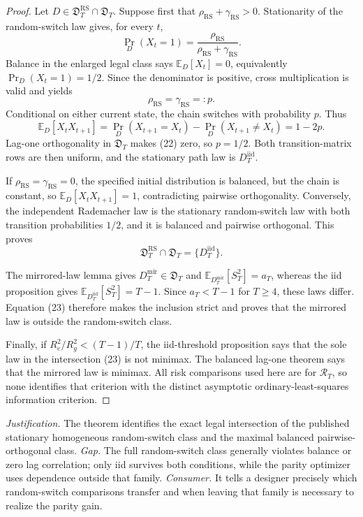 \documentclass{article}
\begin{document}
\begin{proof}
Let \(D\in\mathfrak D_T^{\mathrm{RS}}\cap\mathfrak D_T\).  Suppose first that \(\rho_{\mathrm{RS}}+\gamma_{\mathrm{RS}}>0\).  Stationarity of the random-switch law gives, for every \(t\),
\[
\Pr_D(X_t=1)=\frac{\rho_{\mathrm{RS}}}{\rho_{\mathrm{RS}}+\gamma_{\mathrm{RS}}}.
\]
Balance in the enlarged legal class says \(\mathbb E_D[X_t]=0\), equivalently \(\Pr_D(X_t=1)=1/2\).  Since the denominator is positive, cross multiplication is valid and yields
\[
\rho_{\mathrm{RS}}=\gamma_{\mathrm{RS}}=:p.
\tag{21}
\]
Conditional on either current state, the chain switches with probability \(p\).  Thus
\[
\mathbb E_D[X_tX_{t+1}]
=\Pr_D(X_{t+1}=X_t)-\Pr_D(X_{t+1}\ne X_t)
=1-2p.
\tag{22}
\]
Lag-one orthogonality in \(\mathfrak D_T\) makes (22) zero, so \(p=1/2\).  Both transition-matrix rows are then uniform, and the stationary path law is \(D_T^{\mathrm{iid}}\).

If \(\rho_{\mathrm{RS}}=\gamma_{\mathrm{RS}}=0\), the specified initial distribution is balanced, but the chain is constant, so \(\mathbb E_D[X_tX_{t+1}]=1\), contradicting pairwise orthogonality.  Conversely, the independent Rademacher law is the stationary random-switch law with both transition probabilities \(1/2\), and it is balanced and pairwise orthogonal.  This proves
\[
\mathfrak D_T^{\mathrm{RS}}\cap\mathfrak D_T=\{D_T^{\mathrm{iid}}\}.
\tag{23}
\]

The mirrored-law lemma gives \(D_T^{\mathrm{mir}}\in\mathfrak D_T\) and \(\mathbb E_{D_T^{\mathrm{mir}}}[S_T^2]=a_T\), whereas the iid proposition gives \(\mathbb E_{D_T^{\mathrm{iid}}}[S_T^2]=T-1\).  Since \(a_T<T-1\) for \(T\ge4\), these laws differ.  Equation (23) therefore makes the inclusion strict and proves that the mirrored law is outside the random-switch class.

Finally, if \(R_e^2/R_g^2<(T-1)/T\), the iid-threshold proposition says that the sole law in the intersection (23) is not minimax.  The balanced lag-one theorem says that the mirrored law is minimax.  All risk comparisons used here are for \(\mathcal R_T\), so none identifies that criterion with the distinct asymptotic ordinary-least-squares information criterion.
\end{proof}
\par\smallskip\noindent \textit{Justification.} The theorem identifies the exact legal intersection of the published stationary homogeneous random-switch class and the maximal balanced pairwise-orthogonal class. \textit{Gap.} The full random-switch class generally violates balance or zero lag correlation; only iid survives both conditions, while the parity optimizer uses dependence outside that family. \textit{Consumer.} It tells a designer precisely which random-switch comparisons transfer and when leaving that family is necessary to realize the parity gain.
\end{document}
